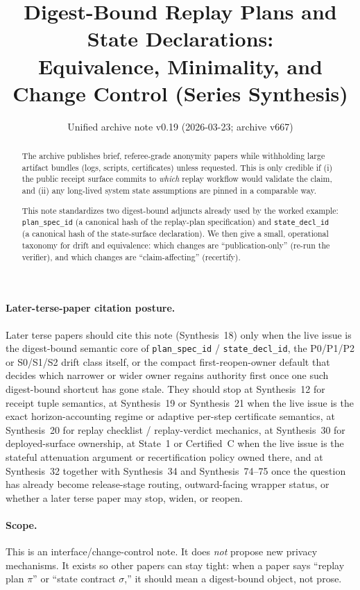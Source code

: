\documentclass[11pt]{article}
\title{Digest-Bound Replay Plans and State Declarations:\\
\large Equivalence, Minimality, and Change Control (Series Synthesis)}
\author{}
\date{Unified archive note v0.19 (2026-03-23; archive v667)}
\begin{document}
\maketitle

\begin{abstract}
The archive publishes brief, referee-grade anonymity papers while withholding large artifact bundles (logs, scripts, certificates) unless requested.
This is only credible if (i) the public receipt surface commits to \emph{which} replay workflow would validate the claim, and (ii) any long-lived system state assumptions are pinned in a comparable way.

This note standardizes two digest-bound adjuncts already used by the worked example:
\texttt{plan\_spec\_id} (a canonical hash of the replay-plan specification) and \texttt{state\_decl\_id} (a canonical hash of the state-surface declaration).
We then give a small, operational taxonomy for drift and equivalence:
which changes are ``publication-only'' (re-run the verifier), and which changes are ``claim-affecting'' (recertify).
\end{abstract}

\paragraph{Later-terse-paper citation posture.}
Later terse papers should cite this note (Synthesis~18) only when the live issue is the digest-bound semantic core of \texttt{plan\_spec\_id} / \texttt{state\_decl\_id}, the P0/P1/P2 or S0/S1/S2 drift class itself, or the compact first-reopen-owner default that decides which narrower or wider owner regains authority first once one such digest-bound shortcut has gone stale.
They should stop at Synthesis~12 for receipt tuple semantics, at Synthesis~19 or Synthesis~21 when the live issue is the exact horizon-accounting regime or adaptive per-step certificate semantics, at Synthesis~20 for replay checklist / replay-verdict mechanics, at Synthesis~30 for deployed-surface ownership, at State~1 or Certified~C when the live issue is the stateful attenuation argument or recertification policy owned there, and at Synthesis~32 together with Synthesis~34 and Synthesis~74--75 once the question has already become release-stage routing, outward-facing wrapper status, or whether a later terse paper may stop, widen, or reopen.

\paragraph{Scope.}
This is an interface/change-control note.
It does \emph{not} propose new privacy mechanisms.
It exists so other papers can stay tight:
when a paper says ``replay plan $\pi$'' or ``state contract $\sigma$,'' it should mean a digest-bound object, not prose.
\end{document}
